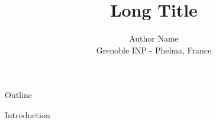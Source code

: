 \documentclass{beamer}
\author[@phelma.grenoble-inp.fr]{ Author Name \\
Grenoble INP - Phelma, France}
\title[Short Title]{Long Title}
\begin{document}
 
%
\frame{\titlepage}

%
\begin{frame}{Outline}
\tableofcontents
\end{frame}
%
\begin{frame}{Introduction}
    \tableofcontents
\end{frame}
\end{document}
